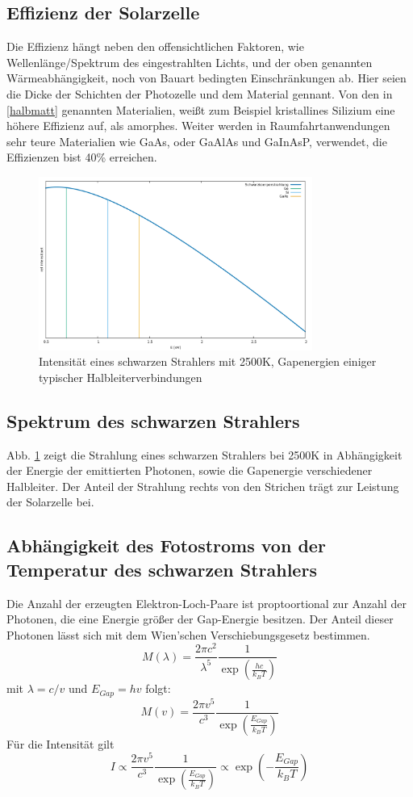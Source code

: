 \subsection*{Effizienz der Solarzelle}
Die Effizienz hängt neben den offensichtlichen Faktoren, wie Wellenlänge/Spektrum des eingestrahlten Lichts, und der oben genannten Wärmeabhängigkeit, noch von Bauart bedingten Einschränkungen ab. Hier seien die Dicke der Schichten der Photozelle und dem Material gennant. 
Von den in \ref{halbmatt} genannten Materialien, weißt zum Beispiel kristallines Silizium eine höhere Effizienz auf, als amorphes. Weiter werden in Raumfahrtanwendungen sehr teure Materialien wie GaAs, oder GaAlAs und GaInAsP, verwendet, die Effizienzen bist 40\% erreichen.

\begin{figure}[htb]
	\centering
	\includegraphics[width=0.8\textwidth]{Abb/aufg18.pdf}
	\caption{Intensität eines schwarzen Strahlers mit 2500K, Gapenergien einiger typischer Halbleiterverbindungen}
	\label{aufg18}
\end{figure}
\subsection*{Spektrum des schwarzen Strahlers}
Abb. \ref{aufg18} zeigt die Strahlung eines schwarzen Strahlers bei 2500K in Abhängigkeit der Energie der emittierten Photonen, sowie die Gapenergie verschiedener Halbleiter. Der Anteil der Strahlung rechts von den Strichen trägt zur Leistung der Solarzelle bei.

\subsection*{Abhängigkeit des Fotostroms von der Temperatur des schwarzen Strahlers}
Die Anzahl der erzeugten Elektron-Loch-Paare ist proptoortional zur Anzahl der Photonen, die eine Energie größer der Gap-Energie besitzen. Der Anteil dieser Photonen lässt sich mit dem Wien'schen Verschiebungsgesetz bestimmen. 
\[
M( \lambda ) = \frac{2 \pi c^2}{ \lambda^5 } \frac{ 1 }{ \exp \left( \frac{hc}{k_B T} \right) }
\]
mit $\lambda = c/v$ und $E_{Gap} = hv$ folgt:
\[
M(v) = \frac{2 \pi v^5}{c^3} \frac{1}{ \exp \left( \frac{E_{Gap}}{k_B T} \right)}
\]
Für die Intensität gilt
\[
I \propto \frac{2 \pi v^5}{c^3} \frac{1}{ \exp \left( \frac{E_{Gap}}{k_B T} \right)} \propto \exp \left( - \frac{E_{Gap}}{k_B T} \right)
\]
